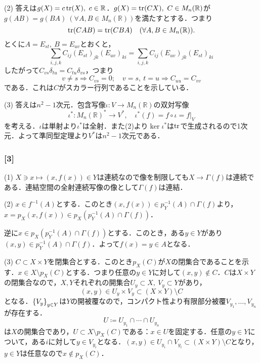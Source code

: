 \documentclass[a4j]{ltjsarticle}
\newcommand{\Rset}{\mathbb{R}}
\newcommand{\1}{\mathbbm{1}}
\numberwithin{equation}{section}
\theoremstyle{definition}
\begin{document}
(2) 答えは$g(X)=c\tr(X),\ c\in\Rset$．$g(X)=\tr(CX),\ C\in M_n(\Rset)$が$g(AB)=g(BA)\ (\forall A,B\in M_n(\Rset))$を満たすとする．つまり
\begin{equation}
    \tr(CAB)=\tr(CBA)\quad (\forall A,B\in M_n(\Rset)).
\end{equation}
とくに$A=E_{st},\ B=E_{uv}$とおくと，
\begin{equation}
    \sum_{i,j,k}C_{ij}(E_{st})_{jk}(E_{uv})_{ki}=\sum_{i,j,k}C_{ij}(E_{uv})_{jk}(E_{st})_{ki}
\end{equation}
したがって$C_{vs}\delta_{tu}=C_{tu}\delta_{vs}$，つまり
\begin{equation}
    v\neq s\Longrightarrow C_{vs}=0;\quad v=s,\ t=u\Longrightarrow C_{uu}=C_{vv}
\end{equation}
である．これは$C$がスカラー行列であることを示している．

(3) 答えは$n^2-1$次元．包含写像$\iota\colon V\to M_n(\Rset)$の双対写像
\begin{equation}
    \iota^\ast\colon M_n(\Rset)^\ast\to V^\ast,\quad \iota^\ast(f)=f\circ \iota=f|_{V}  
\end{equation}
を考える．$\iota$は単射より$\iota^\ast$は全射．また(2)より$\ker\iota^\ast$は$\tr$で生成されるので1次元．よって準同型定理より$V^\ast$は$n^2-1$次元である．

\subsubsection*{[3]}
(1) $X\ni x\mapsto(x,f(x))\in Y$は連続なので像を制限しても$X\to \Gamma(f)$は連続である．連結空間の全射連続写像の像として$\Gamma(f)$は連結．

(2) $x\in f^{-1}(A)$とする．このとき$(x,f(x))\in p_Y^{-1}(A)\cap\Gamma(f)$より，$x=p_X(x,f(x))\in p_X(p_Y^{-1}(A)\cap \Gamma(f))$．

逆に$x\in p_X(p_Y^{-1}(A)\cap \Gamma(f))$とする．このとき，ある$y\in Y$があり$(x,y)\in p_{Y}^{-1}(A)\cap \Gamma(f)$．よって$f(x)=y\in A$となる．

(3) $C\subset X\times Y$を閉集合とする．このとき$p_X(C)$が$X$の閉集合であることを示す．$x\in X\setminus p_X(C)$とする．つまり任意の$y\in Y$に対して$(x,y)\notin C$．$C$は$X\times Y$の閉集合なので，$X,Y$それぞれの開集合$U_y\subset X,\ V_y\subset Y$があり，
\begin{equation}
    (x,y)\in U_y\times V_y\subset (X\times Y)\setminus C 
\end{equation}
となる．$\qty{V_y}_{y\in Y}$は$Y$の開被覆なので，コンパクト性より有限部分被覆$V_{y_1},\ldots,V_{y_n}$が存在する．
\begin{equation}
    U\coloneq U_{y_1}\cap\cdots\cap U_{y_n} 
\end{equation}
は$X$の開集合であり，$U\subset X\setminus p_X(C)$である：$x\in U$を固定する．任意の$y\in Y$について，ある$i$に対して$y\in V_{y_i}$となる．$(x,y)\in U_{y_i}\cap V_{y_i}\subset (X\times Y)\setminus C$となり，$y\in Y$は任意なので$x\notin p_X(C)$．
\end{document}
